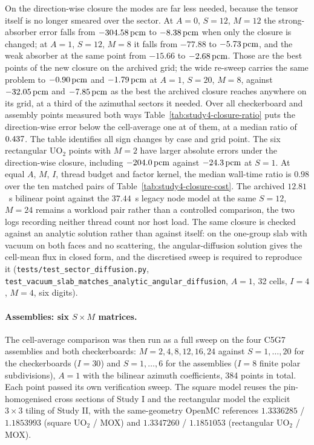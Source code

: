 


On the direction-wise closure the modes are far less needed, because the tensor itself
is no longer smeared over the sector. At $A{=}0$, $S{=}12$, $M{=}12$ the strong-absorber
error falls from $-304.58\,\mathrm{pcm}$ to $-8.38\,\mathrm{pcm}$ when only the closure is changed; at
$A{=}1$, $S{=}12$, $M{=}8$ it falls from $-77.88$ to $-5.73\,\mathrm{pcm}$, and the weak absorber
at the same point from $-15.66$ to $-2.68\,\mathrm{pcm}$. Those are the best points of the new
closure on the archived grid; the wide re-sweep carries the same problem to $-0.90\,\mathrm{pcm}$
and $-1.79\,\mathrm{pcm}$ at $A{=}1$, $S{=}20$, $M{=}8$, against $-32.05\,\mathrm{pcm}$ and $-7.85\,\mathrm{pcm}$ as
the best the archived closure reaches anywhere on its grid, at a third of the azimuthal
sectors it needed. Over all \StudyFourPairs{} checkerboard and assembly points measured both ways
Table~\ref{tab:study4-closure-ratio} puts the direction-wise error below the cell-average
one at \StudyFourSmaller{} of them, at a median ratio of $0.437$.
The table identifies all \StudyFourSignChanges{} sign changes by case and grid point.
The six rectangular UO$_2$ points with $M{=}2$ have larger absolute errors under the
direction-wise closure, including $-204.0\,\mathrm{pcm}$ against $-24.3\,\mathrm{pcm}$ at $S{=}1$.
At equal $A$, $M$, $I$, thread budget and factor kernel, the median wall-time ratio
is $0.98$ over the ten matched pairs of
Table~\ref{tab:study4-closure-cost}. The archived $12.81$~s bilinear point against the
$37.44$~s legacy node model at the same $S{=}12$, $M{=}24$ remains a workload pair rather
than a controlled comparison, the two logs recording neither thread count nor host load.
The same closure is checked against an
analytic solution rather than against itself: on the one-group slab with
vacuum on both faces and no scattering, the angular-diffusion solution
gives the cell-mean flux in closed form, and the discretised sweep is
required to reproduce it (\texttt{tests/test\_sector\_diffusion.py},
\texttt{test\_\allowbreak vacuum\_\allowbreak slab\_\allowbreak matches\_\allowbreak analytic\_\allowbreak angular\_\allowbreak diffusion},
$A{=}1$, 32 cells, $I{=}4$, $M{=}4$, six digits).

\paragraph{Assemblies: six $S\times M$ matrices.}
The cell-average comparison was then run as a full sweep on the four C5G7
assemblies and
both checkerboards: $M{=}2,4,8,12,16,24$ against
$S{=}1,\ldots,20$ for the checkerboards ($I{=}30$) and
$S{=}1,\ldots,6$ for the assemblies ($I{=}8$ finite polar subdivisions),
$A{=}1$ with the bilinear azimuth coefficients, 384 points in total. Each
point passed its own verification sweep. The square model reuses the
pin-homogenised cross sections of Study I and the rectangular model the
explicit $3\times3$ tiling of Study II, with the same-geometry OpenMC
references $1.3336285$ / $1.1853993$ (square UO$_2$ / MOX) and
$1.3347260$ / $1.1851053$ (rectangular UO$_2$ / MOX).

